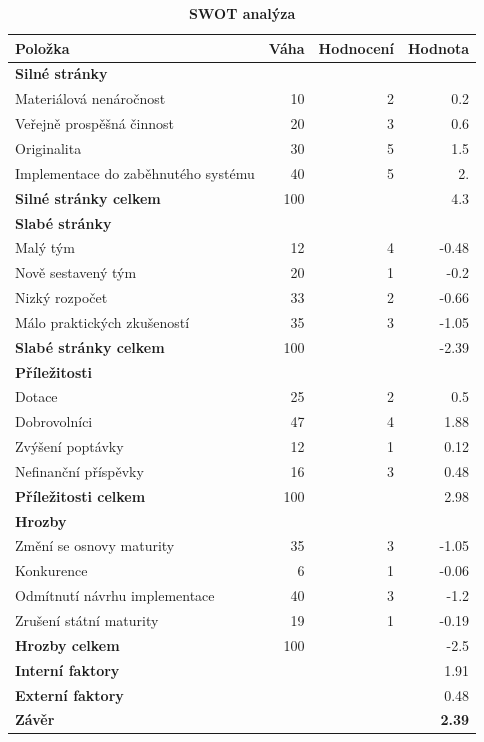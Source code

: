 \documentclass[12pt, a4paper]{report}
\begin{document}
\begin{table}[htbp]
\caption{\label{tab:org5202e4b}
\textbf{SWOT analýza}}
\centering
\footnotesize
\begin{tabularx}{\textwidth}{|X|r|r|r|}
\hline
Položka & Váha & Hodnocení & Hodnota\\
\hline
\textbf{Silné stránky} &  &  & \\
Materiálová nenáročnost & 10 & 2 & 0.2\\
Veřejně prospěšná činnost & 20 & 3 & 0.6\\
Originalita & 30 & 5 & 1.5\\
Implementace do zaběhnutého systému & 40 & 5 & 2.\\
\hline
\textbf{Silné stránky celkem} & 100 &  & 4.3\\
\hline
\textbf{Slabé stránky} &  &  & \\
Malý tým & 12 & 4 & -0.48\\
Nově sestavený tým & 20 & 1 & -0.2\\
Nizký rozpočet & 33 & 2 & -0.66\\
Málo praktických zkušeností & 35 & 3 & -1.05\\
\hline
\textbf{Slabé stránky celkem} & 100 &  & -2.39\\
\hline
\textbf{Příležitosti} &  &  & \\
Dotace & 25 & 2 & 0.5\\
Dobrovolníci & 47 & 4 & 1.88\\
Zvýšení poptávky & 12 & 1 & 0.12\\
Nefinanční příspěvky & 16 & 3 & 0.48\\
\hline
\textbf{Příležitosti celkem} & 100 &  & 2.98\\
\hline
\textbf{Hrozby} &  &  & \\
Změní se osnovy maturity & 35 & 3 & -1.05\\
Konkurence & 6 & 1 & -0.06\\
Odmítnutí návrhu implementace & 40 & 3 & -1.2\\
Zrušení státní maturity & 19 & 1 & -0.19\\
\hline
\textbf{Hrozby celkem} & 100 &  & -2.5\\
\hline
\textbf{Interní faktory} &  &  & 1.91\\
\textbf{Externí faktory} &  &  & 0.48\\
\hline
\textbf{Závěr} &  &  & \textbf{2.39}\\
\hline
\end{tabularx}
\end{table}
\end{document}
